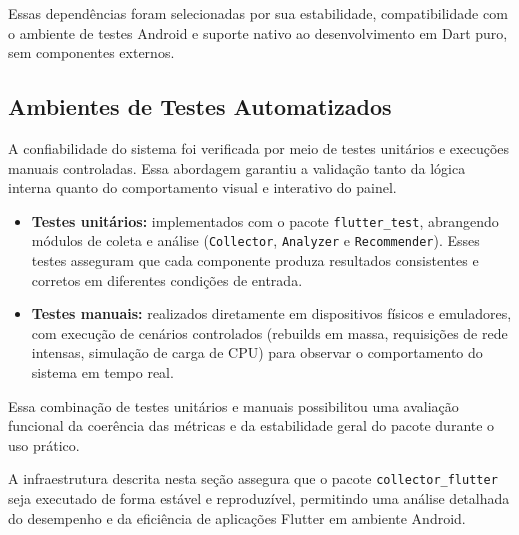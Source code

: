 Essas dependências foram selecionadas por sua estabilidade, compatibilidade com o ambiente de testes Android e suporte nativo ao desenvolvimento em Dart puro, sem componentes externos.

\subsection{Ambientes de Testes Automatizados}

A confiabilidade do sistema foi verificada por meio de testes unitários e execuções manuais controladas. Essa abordagem garantiu a validação tanto da lógica interna quanto do comportamento visual e interativo do painel.

\begin{itemize}
  \item \textbf{Testes unitários:} implementados com o pacote \texttt{flutter\_test}, abrangendo módulos de coleta e análise (\texttt{Collector}, \texttt{Analyzer} e \texttt{Recommender}).
  Esses testes asseguram que cada componente produza resultados consistentes e corretos em diferentes condições de entrada.
  \item \textbf{Testes manuais:} realizados diretamente em dispositivos físicos e emuladores, com execução de cenários controlados (rebuilds em massa, requisições de rede intensas, simulação de carga de CPU) para observar o comportamento do sistema em tempo real.
\end{itemize}

Essa combinação de testes unitários e manuais possibilitou uma avaliação funcional da coerência das métricas e da estabilidade geral do pacote durante o uso prático.

\vspace{0.5em}

A infraestrutura descrita nesta seção assegura que o pacote \texttt{collector\_flutter} seja executado de forma estável e reproduzível, permitindo uma análise detalhada do desempenho e da eficiência de aplicações Flutter em ambiente Android.
